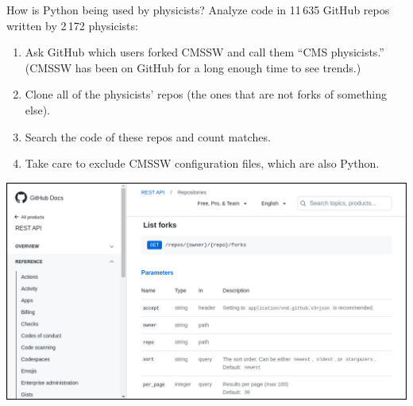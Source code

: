 \documentclass[aspectratio=169]{beamer}
\begin{document}
\begin{frame}{How is Python being used by physicists?}
\vspace{0.5 cm}
{\Large Analyze code in 11\,635 GitHub repos written by 2\,172 physicists:}

\vspace{0.25 cm}
\begin{enumerate}
\item Ask GitHub which users forked CMSSW and call them ``CMS physicists.'' (CMSSW has been on GitHub for a long enough time to see trends.)
\item Clone all of the physicists' repos (the ones that are not forks of something else).
\item Search the code of these repos and count matches.
\item Take care to exclude CMSSW configuration files, which are also Python.
\end{enumerate}

\begin{center}
\includegraphics[width=0.5\linewidth]{github-api-website.png}
\end{center}
\end{frame}
\end{document}

